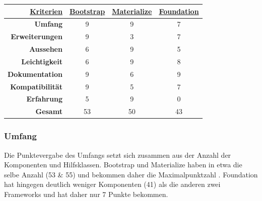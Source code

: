 	\begin{center}
		\begin{table}
			\centering
		\begin{tabular}{rccc}
			\hline
			\multicolumn{1}{|r|}{{\underline{\textbf{Kriterien}}}} & \multicolumn{1}{c|}{{\underline{\textbf{Bootstrap}}}} & \multicolumn{1}{c|}{{ \underline{\textbf{Materialize}}}} & \multicolumn{1}{c|}{{\underline{\textbf{Foundation}}}} \\ \hline
			\multicolumn{1}{|r|}{\textbf{Umfang}}          & \multicolumn{1}{c|}{9}                        & \multicolumn{1}{c|}{9}                          & \multicolumn{1}{c|}{7}                         \\ \hline
			\multicolumn{1}{|r|}{\textbf{Erweiterungen}}   & \multicolumn{1}{c|}{9}                        & \multicolumn{1}{c|}{3}                          & \multicolumn{1}{c|}{7}                         \\ \hline
			\multicolumn{1}{|r|}{\textbf{Aussehen}}        & \multicolumn{1}{c|}{6}                        & \multicolumn{1}{c|}{9}                          & \multicolumn{1}{c|}{5}                         \\ \hline
			\multicolumn{1}{|r|}{\textbf{Leichtigkeit}}    & \multicolumn{1}{c|}{6}                        & \multicolumn{1}{c|}{9}                          & \multicolumn{1}{c|}{8}                         \\ \hline
			\multicolumn{1}{|r|}{\textbf{Dokumentation}}   & \multicolumn{1}{c|}{9}                        & \multicolumn{1}{c|}{6}                          & \multicolumn{1}{c|}{9}                         \\ \hline
			\multicolumn{1}{|r|}{\textbf{Kompatibilität}}  & \multicolumn{1}{c|}{9}                        & \multicolumn{1}{c|}{5}                          & \multicolumn{1}{c|}{7}                         \\ \hline
			\multicolumn{1}{|r|}{\textbf{Erfahrung}}       & \multicolumn{1}{c|}{5}                        & \multicolumn{1}{c|}{9}                          & \multicolumn{1}{c|}{0}                         \\ \hline
			\textbf{Gesamt}                                & 53                                            & 50                                              & 43                                            
		\end{tabular}
	\end{table}
	\end{center}
\subsubsection{Umfang}
\label{chapter:study-frontend-vergleich-umfang}
Die Punktevergabe des Umfangs setzt sich zusammen aus der Anzahl der Komponenten und Hilfsklassen. Bootstrap und Materialize haben in etwa die selbe Anzahl (53 \& 55) und bekommen daher die Maximalpunktzahl \cite{bootstrap-docu,WebDocMaterialize,foundation-webdocu}. Foundation hat hingegen deutlich weniger Komponenten (41) als die anderen zwei Frameworks und hat daher nur 7 Punkte bekommen.
